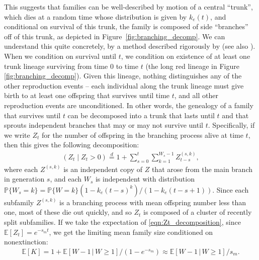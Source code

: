\documentclass{article}
\newcommand{\linelabel}[1]{}
\newcommand{\citet}[1]{\cite{#1}}
\renewcommand{\P}{\mathbb{P}}
\newcommand{\E}{\mathbb{E}}
\newcommand{\deq}{\stackrel{\scriptscriptstyle{d}}{=}}
\newcommand{\given}{\,\vert\,}
\begin{document}
This suggests that families can be well-described by motion of a central ``trunk'',
which dies at a random time whose distribution is given by $k_e(t)$,
and conditional on survival of this trunk, the family is composed of side ``branches'' off of this trunk,
as depicted in Figure~\ref{fig:branching_decomp}.
We can understand this quite concretely, by a method described rigorously by \citet{geiger1999elementary} (see also \citet{chauvin1991growing}). 
When we condition on survival until $t$, we condition on existence of
at least one trunk lineage surviving from time $0$ to time $t$ (the long red
lineage in Figure \ref{fig:branching_decomp}).
Given this lineage, nothing distinguishes any of the other reproduction events --
each individual along the trunk lineage must give birth to at least one offspring that survives until time $t$,
and all other reproduction events are unconditioned.
In other words, the genealogy of a family that survives until $t$
can be decomposed into a trunk that lasts until $t$
and that sprouts independent branches that may or may not survive until $t$.
Specifically, if we write $Z_t$ for the number of offspring in the branching process alive at time $t$,
then this gives the following decomposition:
\begin{align} \label{eqn:Zt_decomposition}
  \left( Z_t \; \vert \; Z_t>0 \right) \deq 1 + \sum_{s=0}^t \sum_{k=1}^{W_s-1} Z^{(s,k)}_{t-s},
\end{align}
where each $Z^{(s,k)}$ is an independent copy of $Z$ 
that arose from the main branch in generation $s$,
and each $W_s$ is independent with distribution $\P\{ W_s = k\} = \P\{ W = k \} (1-k_e(t-s)^k)/(1-k_e(t-s+1))$. \linelabel{ll:branching_process_fix}
Since each subfamily $Z^{(s,k)}$ is a branching process with mean offspring number less than one,
most of these die out quickly,
and so $Z_t$ is composed of a cluster of recently split subfamilies.
If we take the expectation of \eqref{eqn:Zt_decomposition},
since $\E[Z_t] = e^{-s_m t}$,
we get the limiting mean family size conditioned on nonextinction:
\begin{align} \label{eqn:mean_K}
    \E[K] 
    = 1 + \E[W-1 \given W \ge 1] /(1-e^{-s_m}) \approx \E[W-1 \given W \ge 1] / s_m .
\end{align}
\end{document}
